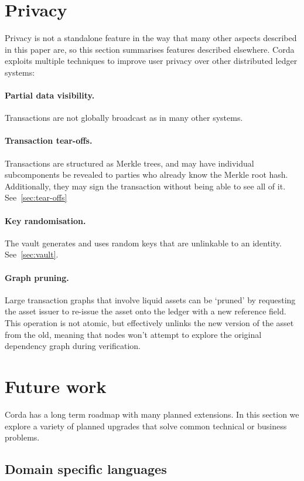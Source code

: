 \documentclass{article}
\begin{document}
\section{Privacy}\label{sec:privacy}

Privacy is not a standalone feature in the way that many other aspects described in this paper are, so this section
summarises features described elsewhere. Corda exploits multiple techniques to improve user privacy over other
distributed ledger systems:

\paragraph{Partial data visibility.}Transactions are not globally broadcast as in many other systems.
\paragraph{Transaction tear-offs.}Transactions are structured as Merkle trees, and may have individual subcomponents be
revealed to parties who already know the Merkle root hash. Additionally, they may sign the transaction without being
able to see all of it. See~\cref{sec:tear-offs}
\paragraph{Key randomisation.}The vault generates and uses random keys that are unlinkable to an identity. See~\cref{sec:vault}.
\paragraph{Graph pruning.}Large transaction graphs that involve liquid assets can be `pruned' by requesting the asset
issuer to re-issue the asset onto the ledger with a new reference field. This operation is not atomic, but effectively
unlinks the new version of the asset from the old, meaning that nodes won't attempt to explore the original dependency
graph during verification.

\section{Future work}

Corda has a long term roadmap with many planned extensions. In this section we explore a variety of planned upgrades
that solve common technical or business problems.

\subsection{Domain specific languages}
\end{document}
